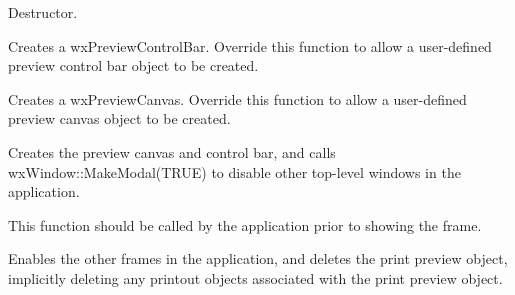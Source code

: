 Destructor. 



Creates a wxPreviewControlBar. Override this function to allow
a user-defined preview control bar object to be created.



Creates a wxPreviewCanvas. Override this function to allow
a user-defined preview canvas object to be created.



Creates the preview canvas and control bar, and calls
wxWindow::MakeModal(TRUE) to disable other top-level windows
in the application.

This function should be called by the application prior to
showing the frame.



Enables the other frames in the application, and deletes the print preview
object, implicitly deleting any printout objects associated with the print
preview object.

